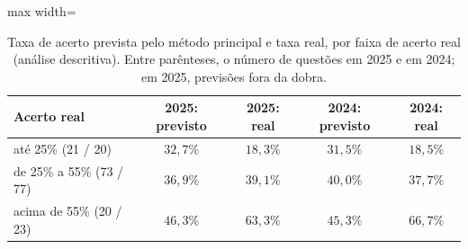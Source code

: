 \begin{table}[ht]
\centering
\caption{Taxa de acerto prevista pelo método principal e taxa real, por faixa de acerto real (análise descritiva). Entre parênteses, o número de questões em 2025 e em 2024; em 2025, previsões fora da dobra.}\label{tab:faixas}
\small
\begin{adjustbox}{max width=\linewidth}
\begin{tabular}{lcccc}
\toprule
Acerto real & 2025: previsto & 2025: real & 2024: previsto & 2024: real \\
\midrule
até 25\% (21 / 20) & $32{,}7\%$ & $18{,}3\%$ & $31{,}5\%$ & $18{,}5\%$ \\
de 25\% a 55\% (73 / 77) & $36{,}9\%$ & $39{,}1\%$ & $40{,}0\%$ & $37{,}7\%$ \\
acima de 55\% (20 / 23) & $46{,}3\%$ & $63{,}3\%$ & $45{,}3\%$ & $66{,}7\%$ \\
\bottomrule
\end{tabular}
\end{adjustbox}
\end{table}
